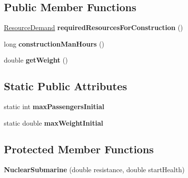 \subsection*{Public Member Functions}
\begin{DoxyCompactItemize}
\item 
\hyperlink{classuniverse_1_1_resource_demand}{Resource\+Demand} {\bfseries required\+Resources\+For\+Construction} ()\hypertarget{classtools_1_1vehicles_1_1sea_1_1_nuclear_submarine_a4a7a6ccfe1e2dd85d5eb6a20c3cdfef7}{}\label{classtools_1_1vehicles_1_1sea_1_1_nuclear_submarine_a4a7a6ccfe1e2dd85d5eb6a20c3cdfef7}

\item 
long {\bfseries construction\+Man\+Hours} ()\hypertarget{classtools_1_1vehicles_1_1sea_1_1_nuclear_submarine_a76aa68c0042ab49d9316ae38322abef4}{}\label{classtools_1_1vehicles_1_1sea_1_1_nuclear_submarine_a76aa68c0042ab49d9316ae38322abef4}

\item 
double {\bfseries get\+Weight} ()\hypertarget{classtools_1_1vehicles_1_1sea_1_1_nuclear_submarine_aa588a62136d645f127dcaadbcb0421b1}{}\label{classtools_1_1vehicles_1_1sea_1_1_nuclear_submarine_aa588a62136d645f127dcaadbcb0421b1}

\end{DoxyCompactItemize}
\subsection*{Static Public Attributes}
\begin{DoxyCompactItemize}
\item 
static int {\bfseries max\+Passengers\+Initial}\hypertarget{classtools_1_1vehicles_1_1sea_1_1_nuclear_submarine_a6a828ca8475258f1deae4ab94f00c3d1}{}\label{classtools_1_1vehicles_1_1sea_1_1_nuclear_submarine_a6a828ca8475258f1deae4ab94f00c3d1}

\item 
static double {\bfseries max\+Weight\+Initial}\hypertarget{classtools_1_1vehicles_1_1sea_1_1_nuclear_submarine_acc00298419a625be44972b35abedf4b8}{}\label{classtools_1_1vehicles_1_1sea_1_1_nuclear_submarine_acc00298419a625be44972b35abedf4b8}

\end{DoxyCompactItemize}
\subsection*{Protected Member Functions}
\begin{DoxyCompactItemize}
\item 
{\bfseries Nuclear\+Submarine} (double resistance, double start\+Health)\hypertarget{classtools_1_1vehicles_1_1sea_1_1_nuclear_submarine_a3f41932726ee7e981bdd12e8e1a7f6b0}{}\label{classtools_1_1vehicles_1_1sea_1_1_nuclear_submarine_a3f41932726ee7e981bdd12e8e1a7f6b0}

\end{DoxyCompactItemize}
